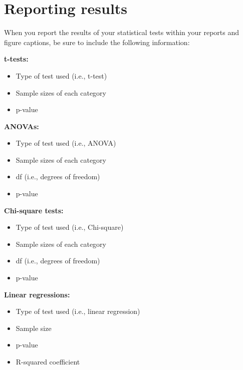 \documentclass[
]{book}
\providecommand{\tightlist}{%
  \setlength{\itemsep}{0pt}\setlength{\parskip}{0pt}}
\begin{document}
\hypertarget{reporting-results}{%
\section*{Reporting results}\label{reporting-results}}

When you report the results of your statistical tests within your reports and figure captions, be sure to include the following information:

\textbf{t-tests:}

\begin{itemize}
\tightlist
\item
  Type of test used (i.e., t-test)\\
\item
  Sample sizes of each category\\
\item
  p-value
\end{itemize}

\textbf{ANOVAs:}

\begin{itemize}
\tightlist
\item
  Type of test used (i.e., ANOVA)\\
\item
  Sample sizes of each category\\
\item
  df (i.e., degrees of freedom)\\
\item
  p-value
\end{itemize}

\textbf{Chi-square tests:}

\begin{itemize}
\tightlist
\item
  Type of test used (i.e., Chi-square)\\
\item
  Sample sizes of each category\\
\item
  df (i.e., degrees of freedom)\\
\item
  p-value
\end{itemize}

\textbf{Linear regressions:}

\begin{itemize}
\tightlist
\item
  Type of test used (i.e., linear regression)\\
\item
  Sample size\\
\item
  p-value\\
\item
  R-squared coefficient
\end{itemize}
\end{document}
